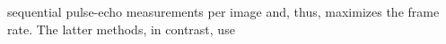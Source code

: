 sequential pulse-echo measurements per
image and, thus, maximizes
the frame rate.
The latter methods, in contrast, use
